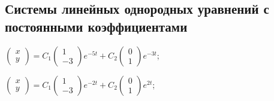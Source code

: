 \subsection*{Системы линейных однородных уравнений с постоянными коэффициентами}

	\begin{enumsolsfull}
		
		\label{sol:linsys_hmg:simple2d}
		\item \( \begin{pmatrix} x \\ y \end{pmatrix} = C_1 \begin{pmatrix} 1 \\ -3 \end{pmatrix} e^{-5t} + C_2 \begin{pmatrix} 0 \\ 1 \end{pmatrix} e^{-3t} \); %
		\item \( \begin{pmatrix} x \\ y \end{pmatrix} = C_1 \begin{pmatrix} 1 \\ -3 \end{pmatrix} e^{-2t} + C_2 \begin{pmatrix} 0 \\ 1 \end{pmatrix} e^{2t} \); %

\end{enumsolsfull}
